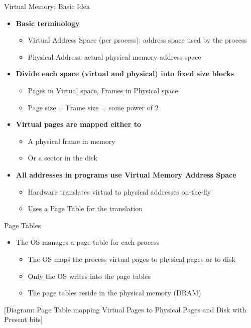 \documentclass[aspectratio=169,12pt]{beamer}
\begin{document}
\begin{frame}{Virtual Memory: Basic Idea}
\begin{itemize}
\item \textbf{Basic terminology}
    \begin{itemize}
    \item Virtual Address Space (per process): address space used by the process
    \item Physical Address: actual physical memory address space
    \end{itemize}
\item \textbf{Divide each space (virtual and physical) into fixed size blocks}
    \begin{itemize}
    \item Pages in Virtual space, Frames in Physical space
    \item Page size = Frame size = some power of 2
    \end{itemize}
\item \textbf{Virtual pages are mapped either to}
    \begin{itemize}
    \item A physical frame in memory
    \item Or a sector in the disk
    \end{itemize}
\item \textbf{All addresses in programs use Virtual Memory Address Space}
    \begin{itemize}
    \item Hardware translates virtual to physical addresses on-the-fly
    \item Uses a Page Table for the translation
    \end{itemize}
\end{itemize}
\end{frame}

\begin{frame}{Page Tables}
\begin{itemize}
\item The OS manages a page table for each process
    \begin{itemize}
    \item The OS maps the process virtual pages to physical pages or to disk
    \item Only the OS writes into the page tables
    \item The page tables reside in the physical memory (DRAM)
    \end{itemize}
\end{itemize}
\begin{center}
[Diagram: Page Table mapping Virtual Pages to Physical Pages and Disk with Present bits]
\end{center}
\end{frame}
\end{document}
